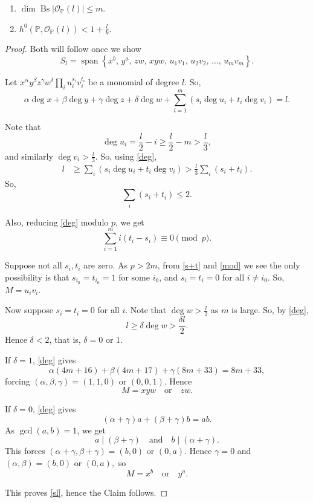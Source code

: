 \documentclass[10pt,a4paper]{amsart}
\begin{document}
\begin{claim}\label{bs}
\begin{enumerate}
\item[(1)] $\dim \operatorname{Bs}|\mathcal O_{\mathbb P}(l)|\le m$.

\item[(2)] $
h^0(\mathbb P,\mathcal O_{\mathbb P}(l))
<
1+\frac{l}{k}.$
\end{enumerate}
\end{claim}

\begin{proof}
Both will follow once we show
\begin{equation}\label{sl}
S_l=
\operatorname{span}
\left\{
x^b,\,
y^a,\,
zw,\,
xyw,\,
u_1v_1,\,
u_2v_2,\,
\ldots,\,
u_mv_m
\right\}.
\end{equation}

Let $x^\alpha y^\beta z^\gamma w^\delta
\prod_i u_i^{s_i}v_i^{t_i}$
be a monomial of degree $l$. So,
\begin{equation}\label{deg}
\alpha\deg x+\beta\deg y+\gamma\deg z+\delta\deg w
+\sum_{i=1}^{m}\left(s_i\deg u_i+t_i\deg v_i\right)=l.
\end{equation}

Note that
\[
\deg u_i=\frac{l}{2}-i\ge \frac{l}{2}-m>\frac{l}{3},
\]
and similarly $\deg v_i>\frac{l}{3}$. So, using \eqref{deg},
\begin{align*}
l
&\ge
\sum_i\left(s_i\deg u_i+t_i\deg v_i\right)
>
\frac{l}{3}\sum_i(s_i+t_i).
\end{align*}
So,
\begin{equation}\label{s+t}
\sum_i(s_i+t_i)\le 2.
\end{equation}

Also, reducing \ref{deg} modulo $p$, we get
\begin{equation}\label{mod}
\sum_{i=1}^m i(t_i-s_i)\equiv 0 \pmod p.
\end{equation}

Suppose not all $s_i,t_i$ are zero. As $p>2m$, from \eqref{s+t} and \eqref{mod} we see the only possibility is that
$s_{i_0}=t_{i_0}=1$ for some $i_0$, and
$s_i=t_i=0$ for all $i\neq i_0$. So, $M=u_iv_i.$

Now suppose $s_i=t_i=0$ for all $i$. Note that
$\deg w>\frac{l}{2}$ as $m$ is large. So, by \eqref{deg},
\[
l\ge \delta\deg w>\frac{\delta l}{2}.
\]
Hence $\delta<2$, that is, $\delta=0$ or $1$.

If $\delta=1$, \eqref{deg} gives
\[
\alpha(4m+16)+\beta(4m+17)+\gamma(8m+33)=8m+33,
\]
forcing $(\alpha,\beta,\gamma)=(1,1,0)
\text{ or }
(0,0,1).$
Hence
\[
M=xyw \quad\text{or}\quad zw.
\]

If $\delta=0$, \eqref{deg} gives
\[
(\alpha+\gamma)a+(\beta+\gamma)b=ab.
\]
As $\gcd(a,b)=1$, we get
\[
a\mid (\beta+\gamma)
\quad\text{and}\quad
b\mid (\alpha+\gamma).
\]
This forces $(\alpha+\gamma,\beta+\gamma)=(b,0)
\text{ or }
(0,a).$
Hence $\gamma=0$ and $(\alpha,\beta)=(b,0)
\text{ or }
(0,a),$
so
\[
M=x^b \quad\text{or}\quad y^a.
\]

This proves \eqref{sl}, hence the Claim follows.
\end{proof}
\end{document}
